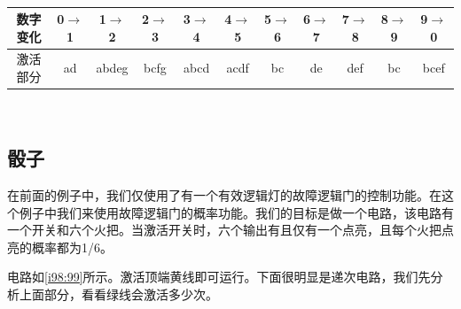 \begin{table}[h]
\centering
\begin{tabular}{c|c|c|c|c|c|c|c|c|c|c}
数字变化&0$\to$1&1$\to$2&2$\to$3&3$\to$4&4$\to$5&5$\to$6&6$\to$7&7$\to$8&8$\to$9&9$\to$0\\
\hline
激活部分&ad&abdeg&bcfg&abcd&acdf&bc&de&def&bc&bcef
\end{tabular}
\caption{}
\label{jishuqi}
\end{table}

\begin{figure}[!h]
\begin{center}
\\
\end{center}
\caption{}
\label{i113:114}
\end{figure}

\subsection{骰子}

在前面的例子中，我们仅使用了有一个有效逻辑灯的故障逻辑门的控制功能。在这个例子中我们来使用故障逻辑门的概率功能。我们的目标是做一个电路，该电路有一个开关和六个火把。当激活开关时，六个输出有且仅有一个点亮，且每个火把点亮的概率都为1/6。

电路如\autoref{i98:99}所示。激活顶端黄线即可运行。下面很明显是递次电路，我们先分析上面部分，看看绿线会激活多少次。

